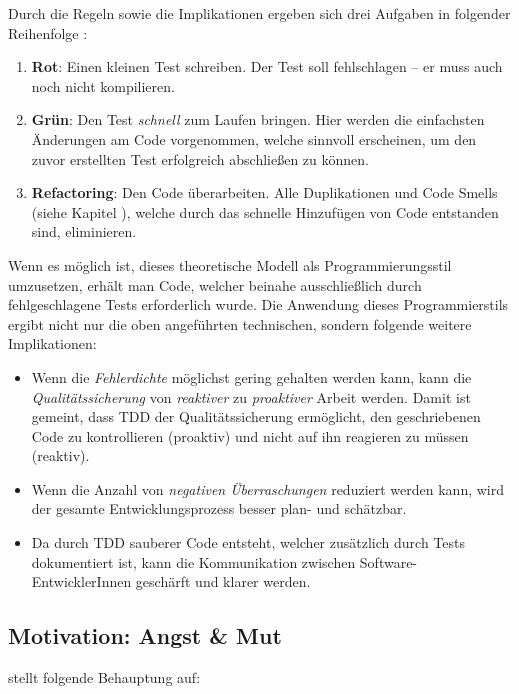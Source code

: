 \newpage
Durch die Regeln sowie die Implikationen ergeben sich drei Aufgaben in folgender Reihenfolge \autocite[x]{Beck:2003}:
\begin{enumerate}
  \item \textbf{Rot}: Einen kleinen Test schreiben.\newline
  Der Test soll fehlschlagen -- er muss auch noch nicht kompilieren.
  \item \textbf{Grün}: Den Test \textit{schnell} zum Laufen bringen.\newline
  Hier werden die einfachsten Änderungen am Code vorgenommen, welche sinnvoll erscheinen, um den zuvor erstellten Test erfolgreich abschließen zu können.
  \item \textbf{Refactoring}: Den Code überarbeiten.\newline
  Alle Duplikationen und Code Smells (siehe Kapitel ), welche durch das schnelle Hinzufügen von Code entstanden sind, eliminieren.
\end{enumerate}
Wenn es möglich ist, dieses theoretische Modell als Programmierungsstil umzusetzen, erhält man Code, welcher beinahe ausschließlich durch fehlgeschlagene Tests erforderlich wurde. Die Anwendung dieses Programmierstils ergibt nicht nur die oben angeführten technischen, sondern folgende weitere Implikationen:
\begin{itemize}
  \item Wenn die \textit{Fehlerdichte} möglichst gering gehalten werden kann, kann die \textit{Qualitätssicherung} von \textit{reaktiver} zu \textit{proaktiver} Arbeit werden. Damit ist gemeint, dass TDD der Qualitätssicherung ermöglicht, den geschriebenen Code zu kontrollieren (proaktiv) und nicht auf ihn reagieren zu müssen (reaktiv).
  \item Wenn die Anzahl von \textit{negativen Überraschungen} reduziert werden kann, wird der gesamte Entwicklungsprozess besser plan- und schätzbar.
  \item Da durch TDD sauberer Code entsteht, welcher zusätzlich durch Tests dokumentiert ist, kann die Kommunikation zwischen Software-EntwicklerInnen geschärft und klarer werden.
\end{itemize}

\subsection{Motivation: Angst {\&} Mut}
\cite[xi]{Beck:2003} stellt folgende Behauptung auf: \newline
{}

